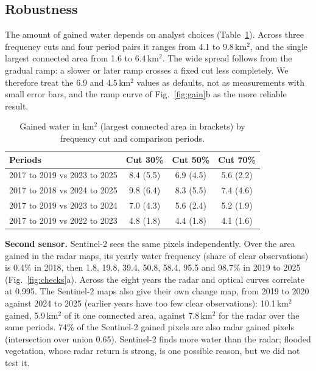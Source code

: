 \documentclass[conference]{IEEEtran}
\begin{document}
\subsection{Robustness}
\label{sec:robust}
The amount of gained water depends on analyst choices (Table~\ref{tab:sens}). Across three frequency cuts and four period pairs it ranges from 4.1 to 9.8\,km$^2$, and the single largest connected area from 1.6 to 6.4\,km$^2$. The wide spread follows from the gradual ramp: a slower or later ramp crosses a fixed cut less completely. We therefore treat the 6.9 and 4.5\,km$^2$ values as defaults, not as measurements with small error bars, and the ramp curve of Fig.~\ref{fig:gain}b as the more reliable result.

\begin{table}[t]
\centering
\caption{Gained water in km$^2$ (largest connected area in brackets) by frequency cut and comparison periods.}
\label{tab:sens}
\small
\begin{tabular}{lccc}
\toprule
Periods & Cut 30\% & Cut 50\% & Cut 70\% \\
\midrule
2017 to 2019 vs 2023 to 2025 & 8.4 (5.5) & 6.9 (4.5) & 5.6 (2.2) \\
2017 to 2018 vs 2024 to 2025 & 9.8 (6.4) & 8.3 (5.5) & 7.4 (4.6) \\
2017 to 2019 vs 2023 to 2024 & 7.0 (4.3) & 5.6 (2.4) & 5.2 (1.9) \\
2017 to 2019 vs 2022 to 2023 & 4.8 (1.8) & 4.4 (1.8) & 4.1 (1.6) \\
\bottomrule
\end{tabular}
\end{table}

\textbf{Second sensor.} Sentinel-2 sees the same pixels independently. Over the area gained in the radar maps, its yearly water frequency (share of clear observations) is 0.4\% in 2018, then 1.8, 19.8, 39.4, 50.8, 58.4, 95.5 and 98.7\% in 2019 to 2025 (Fig.~\ref{fig:checks}a). Across the eight years the radar and optical curves correlate at 0.995. The Sentinel-2 maps also give their own change map, from 2019 to 2020 against 2024 to 2025 (earlier years have too few clear observations): 10.1\,km$^2$ gained, 5.9\,km$^2$ of it one connected area, against 7.8\,km$^2$ for the radar over the same periods. 74\% of the Sentinel-2 gained pixels are also radar gained pixels (intersection over union 0.65). Sentinel-2 finds more water than the radar; flooded vegetation, whose radar return is strong, is one possible reason, but we did not test it.
\end{document}
